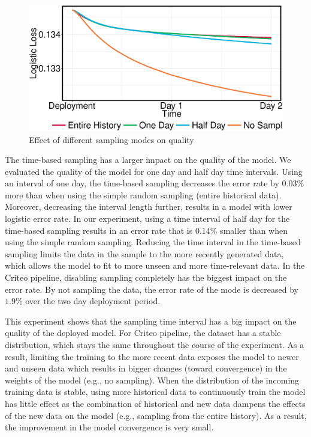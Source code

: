\begin{figure}[h!]
\centering
\includegraphics[width=\columnwidth]{../images/experiment-results/criteo-sampling-mode-experiments.eps}
\caption{Effect of different sampling modes on quality}
\label{fig:sampling-mode-quality}
\vspace{2mm}
\end{figure}

The time-based sampling has a larger impact on the quality of the model.
We evaluated the quality of the model for one day and half day time intervals.
Using an interval of one day, the time-based sampling decreases the error rate by 0.03\%  more than when using the simple random sampling (entire historical data).
Moreover, decreasing the interval length further, results in a model with lower logistic error rate.
In our experiment, using a time interval of half day for the time-based sampling results in an error rate that is 0.14\% smaller than when using the simple random sampling. 
Reducing the time interval in the time-based sampling limits the data in the sample to the more recently generated data, which allows the model to fit to more unseen and more time-relevant data.
In the Criteo pipeline, disabling sampling completely has the biggest impact on the error rate.
By not sampling the data, the error rate of the mode is decreased by $1.9\%$ over the two day deployment period.

This experiment shows that the sampling time interval has a big impact on the quality of the deployed model.
For Criteo pipeline, the dataset has a stable distribution, which stays the same throughout the course of the experiment.
As a result, limiting the training to the more recent data exposes the model to newer and unseen data which results in bigger changes (toward convergence) in the weights of the model (e.g., no sampling).
When the distribution of the incoming training data is stable, using more historical data to continuously train the model has little effect as the combination of historical and new data dampens the effects of the new data on the model (e.g., sampling from the entire history).
As a result, the improvement in the model convergence is very small.

